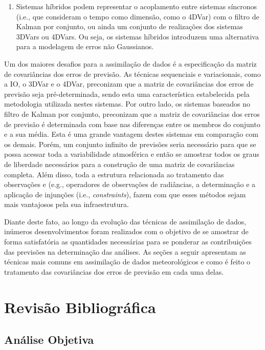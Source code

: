 \begin{enumerate}
    \item Sistemas híbridos podem representar o acoplamento entre sistemas síncronos (i.e., que consideram o tempo como dimensão, como o 4DVar) com o filtro de Kalman por conjunto, ou ainda um conjunto de realizações dos sistemas 3DVars ou 4DVars. Ou seja, os sistemas híbridos introduzem uma alternativa para a modelagem de erros não Gaussianos.
\end{enumerate}

Um dos maiores desafios para a assimilação de dados é a especificação da matriz de covariâncias dos erros de previsão. As técnicas sequenciais e variacionais, como a IO, o 3DVar e o 4DVar, preconizam que a matriz de covariâncias dos erros de previsão seja pré-determinada, sendo esta uma característica estabelecida pela metodologia utilizada nestes sistemas. Por outro lado, os sistemas baseados no filtro de Kalman por conjunto, preconizam que a matriz de covariâncias dos erros de previsão é determinada com base nas diferenças entre os membros do conjunto e a sua média. Esta é uma grande vantagem destes sistemas em comparação com os demais. Porém, um conjunto infinito de previsões seria necessário para que se possa acessar toda a variabilidade atmosférica e então se amostrar todos os graus de liberdade necessários para a construção de uma matriz de covariâncias completa. Além disso, toda a estrutura relacionada ao tratamento das observações e (e.g., operadores de observações de radiâncias, a determinação e a aplicação de injunções (i.e., \textit{constraints}), fazem com que esses métodos sejam mais vantajosos pela sua infraestrutura.

Diante deste fato, ao longo da evolução das técnicas de assimilação de dados, inúmeros desenvolvimentos foram realizados com o objetivo de se amostrar de forma satisfatória as quantidades necessárias para se ponderar as contribuições das previsões na determinação das análises. As seções a seguir apresentam as técnicas mais comuns em assimilação de dados meteorológicos e como é feito o tratamento das covariâncias dos erros de previsão em cada uma delas.

\section{Revisão Bibliográfica}
\label{rev_biblio}

\subsection{Análise Objetiva} 
\label{anl_obj}

